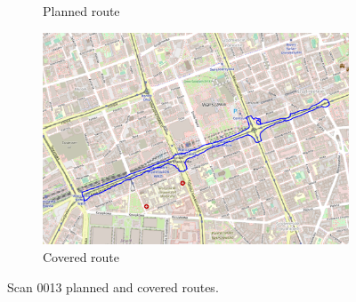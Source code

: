 \documentclass[a4paper,12pt]{article}
\begin{document}
\begin{enumerate}
\begin{figure}[H]
\begin{subfigure}{.90\textwidth}
			\caption{Planned route}
			\label{fig:a13}
		\end{subfigure}%
		\linebreak
		\begin{subfigure}{.90\textwidth}
			\centering
			\includegraphics[width=1\linewidth]{route_c13}
			\caption{Covered route}
			\label{fig:b13}
		\end{subfigure}
		\caption{Scan 0013 planned and covered routes.}
		\label{fig:fig13}
	\end{figure}
	\pagebreak
	

\end{enumerate}
\end{document}
